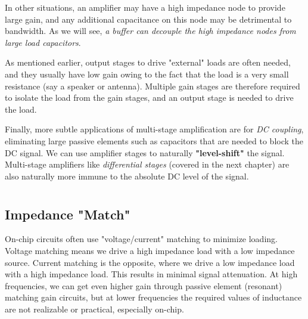 In other situations, an amplifier may have a high impedance node to provide large gain, and any additional capacitance on this node may be detrimental to bandwidth.  As we will see, \textit{a buffer can decouple the high impedance nodes from large load capacitors}.  

As mentioned earlier, output stages to drive "external" loads are often needed, and they usually have low gain owing to the fact that the load is a very small resistance (say a speaker or antenna).  Multiple gain stages are therefore required to isolate the load from the gain stages, and an output stage is needed to drive the load.  

Finally, more subtle applications of multi-stage amplification are for \textit{DC coupling}, eliminating large passive elements such as capacitors that are needed to block the DC signal.   We can use amplifier stages to naturally \textbf{"level-shift"} the signal.  Multi-stage amplifiers like \textit{differential stages} (covered in the next chapter) are also naturally more immune to the absolute DC level of the signal.  
\section{\topicA}
\subsection{Impedance "Match"}
On-chip circuits often use "voltage/current" matching to minimize loading.  Voltage matching means we drive a high impedance load with a low impedance source.  Current matching is the opposite, where we drive a low impedance load with a high impedance load.  This results in minimal signal attenuation.  At high frequencies, we can get even higher gain through passive element (resonant) matching gain circuits, but at lower frequencies the required values of inductance are not realizable or practical, especially on-chip.

